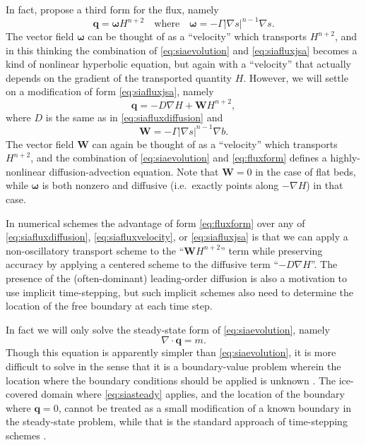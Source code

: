 \documentclass[twocolumn,letterpaper]{igs}
\newcommand\bq{\mathbf{q}}
\newcommand\bW{\mathbf{W}}
\newcommand{\Div}{\nabla\cdot}
\newcommand{\grad}{\nabla}
\begin{document}
In fact, \cite{JaroschSchoofAnslow2013} propose a third form for the flux, namely
\begin{equation}
   \bq = \boldsymbol{\omega} H^{n+2} \quad \text{where} \quad \boldsymbol{\omega} = - \Gamma |\grad s|^{n-1} \grad s. \label{eq:siafluxjsa}
\end{equation}
The vector field $\boldsymbol{\omega}$ can be thought of as a ``velocity'' which transports $H^{n+2}$, and in this thinking the combination of \eqref{eq:siaevolution} and \eqref{eq:siafluxjsa} becomes a kind of nonlinear hyperbolic equation, but again with a ``velocity'' that actually depends on the gradient of the transported quantity $H$.  However, we will settle on a modification of form \eqref{eq:siafluxjsa}, namely
\begin{equation}
\bq = - D \grad H + \bW H^{n+2},\label{eq:fluxform}
\end{equation}
where $D$ is the same as in \eqref{eq:siafluxdiffusion} and
\begin{equation}
\bW = - \Gamma |\grad s|^{n-1} \grad b.  \label{eq:siaWdefine}
\end{equation}
The vector field $\bW$ can again be thought of as a ``velocity'' which transports $H^{n+2}$, and the combination of \eqref{eq:siaevolution} and \eqref{eq:fluxform} defines a highly-nonlinear diffusion-advection equation.  Note that $\bW=0$ in the case of flat beds, while $\boldsymbol{\omega}$ is both nonzero and diffusive (i.e.~exactly points along $-\grad H$) in that case.

In numerical schemes the advantage of form \eqref{eq:fluxform} over any of \eqref{eq:siafluxdiffusion}, \eqref{eq:siafluxvelocity}, or \eqref{eq:siafluxjsa} is that we can apply a non-oscillatory transport scheme to the ``$\bW H^{n+2}$'' term while preserving accuracy by applying a centered scheme to the diffusive term ``$-D \grad H$''.  The presence of the (often-dominant) leading-order diffusion is also a motivation to use implicit time-stepping, but such implicit schemes also need to determine the location of the free boundary at each time step.

In fact we will only solve the steady-state form of \eqref{eq:siaevolution}, namely
\begin{equation}
\Div \bq = m.  \label{eq:siasteady}
\end{equation}
Though this equation is apparently simpler than \eqref{eq:siaevolution}, it is more difficult to solve in the sense that it is a boundary-value problem wherein the location where the boundary conditions should be applied is unknown \citep{JaroschSchoofAnslow2013,JouvetBueler2012}.  The ice-covered domain where \eqref{eq:siasteady} applies, and the location of the boundary where $\bq=0$, cannot be treated as a small modification of a known boundary in the steady-state problem, while that is the standard approach of time-stepping schemes \citep{Bueleretal2005,Huybrechtsetal1996}.
\end{document}
